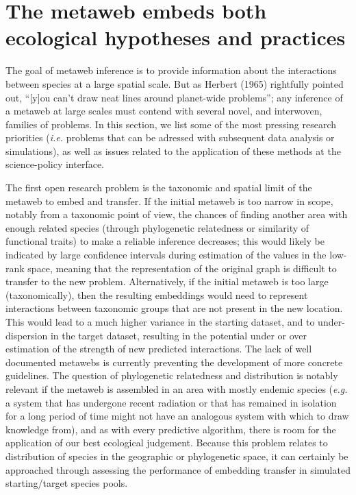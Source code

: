 \documentclass[10pt,oneside]{article}
\begin{document}
\hypertarget{the-metaweb-embeds-both-ecological-hypotheses-and-practices}{%
\section{The metaweb embeds both ecological hypotheses and
practices}\label{the-metaweb-embeds-both-ecological-hypotheses-and-practices}}

The goal of metaweb inference is to provide information about the
interactions between species at a large spatial scale. But as Herbert
(1965) rightfully pointed out, ``{[}y{]}ou can't draw neat lines around
planet-wide problems''; any inference of a metaweb at large scales must
contend with several novel, and interwoven, families of problems. In
this section, we list some of the most pressing research priorities
(\emph{i.e.} problems that can be adressed with subsequent data analysis
or simulations), as well as issues related to the application of these
methods at the science-policy interface.

The first open research problem is the taxonomic and spatial limit of
the metaweb to embed and transfer. If the initial metaweb is too narrow
in scope, notably from a taxonomic point of view, the chances of finding
another area with enough related species (through phylogenetic
relatedness or similarity of functional traits) to make a reliable
inference decreases; this would likely be indicated by large confidence
intervals during estimation of the values in the low-rank space, meaning
that the representation of the original graph is difficult to transfer
to the new problem. Alternatively, if the initial metaweb is too large
(taxonomically), then the resulting embeddings would need to represent
interactions between taxonomic groups that are not present in the new
location. This would lead to a much higher variance in the starting
dataset, and to under-dispersion in the target dataset, resulting in the
potential under or over estimation of the strength of new predicted
interactions. The lack of well documented metawebs is currently
preventing the development of more concrete guidelines. The question of
phylogenetic relatedness and distribution is notably relevant if the
metaweb is assembled in an area with mostly endemic species (\emph{e.g.}
a system that has undergone recent radiation or that has remained in
isolation for a long period of time might not have an analogous system
with which to draw knowledge from), and as with every predictive
algorithm, there is room for the application of our best ecological
judgement. Because this problem relates to distribution of species in
the geographic or phylogenetic space, it can certainly be approached
through assessing the performance of embedding transfer in simulated
starting/target species pools.
\end{document}
